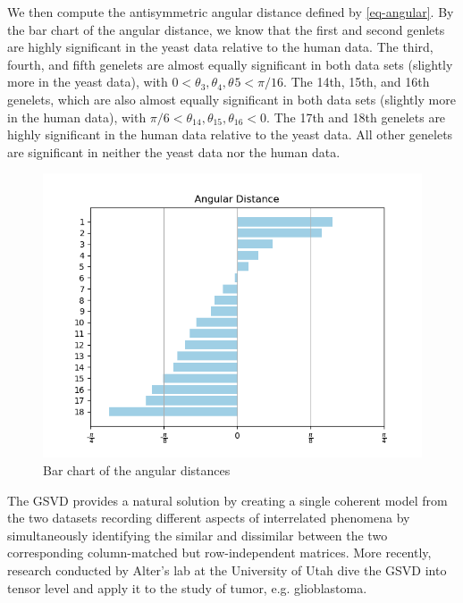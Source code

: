     We then compute the antisymmetric angular distance defined by \eqref{eq-angular}. By the bar chart of the angular distance, we know that the first and second genlets are highly significant in the yeast data relative to the human data. The third, fourth, and fifth genelets are almost equally significant in both data sets (slightly more in the yeast data), with $0 < \theta_{3}, \theta_{4}, \theta_{}{5} < \pi/16$. The 14th, 15th, and 16th genelets, which are also almost equally significant in both data sets (slightly more in the human data), with $\pi/6 < \theta_{14}, \theta_{15}, \theta_{16} < 0$. The 17th and 18th genelets are highly significant in the human data relative to the yeast data. All other genelets are significant in neither the yeast data nor the human data.
    
    \begin{figure}[H]
        \centering
        \includegraphics[width=0.5\linewidth]{fig/angulardist.png}
        \caption{Bar chart of the angular distances}
        \label{angulardistance}
    \end{figure}

The GSVD provides a natural solution by creating a single coherent model from the two datasets recording different aspects of interrelated phenomena by simultaneously identifying the similar and dissimilar between the two corresponding column-matched but row-independent matrices. More recently, research conducted by Alter's lab at the University of Utah dive the GSVD into tensor level \cite{bradley2019gsvd} and apply it to the study of tumor, e.g. glioblastoma. \cite{ponnapalli2020retrospective}











